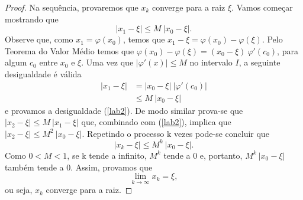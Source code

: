 \begin{proof}
    Na sequência, provaremos que $x_k$ converge para a raiz $\xi$. Vamos começar
    mostrando que
    \begin{equation}\label{lab2}
        |x_1 - \xi| \leq M \ |x_0 - \xi|.
    \end{equation}
    Observe que, como $x_1=\varphi(x_0)$, temos que $x_1 - \xi = \varphi(x_0) - \varphi(\xi)$. Pelo Teorema do Valor Médio temos que $\varphi(x_0) - \varphi(\xi) = (x_0 - \xi) \ \varphi'(c_0)$, para algum $c_0$ entre $x_0$ e $\xi$. Uma vez que $|\varphi'(x)| \leq M$ no intervalo $I$, a seguinte desigualdade é válida
    \begin{align*}
        |x_1 - \xi| & = |x_0 - \xi| \ |\varphi'(c_0)| \\
                    & \leq M \ |x_0 - \xi|
    \end{align*}
    e provamos a desigualdade (\ref{lab2}).
    De modo similar prova-se que $|x_2 - \xi| \leq M \ |x_1 - \xi|$ que, combinado
    com (\ref{lab2}), implica que $|x_2 - \xi| \leq M^2 \ |x_0 - \xi|$. Repetindo o
    processo k vezes pode-se concluir que
    \begin{equation}\label{lim0}
        |x_k - \xi| \leq M^k \ |x_0 - \xi|.
    \end{equation}
    Como $0 < M < 1$, se k tende a infinito, $M^k$ tende a 0 e, portanto, $M^k \ |x_0 - \xi|$ também tende a 0. Assim, provamos que
    \begin{equation}
        \lim_{k \to \infty} x_k = \xi, \label{conv.mpf}
    \end{equation}
    ou seja, $x_k$ converge para a raiz.
\end{proof}

